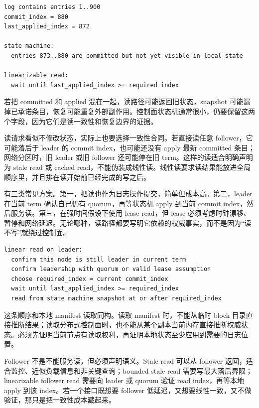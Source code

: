 \begin{lstlisting}[numbers=none,caption={commit 与 apply 的差异}]
log contains entries 1..900
commit_index = 880
last_applied_index = 872

state machine:
  entries 873..880 are committed but not yet visible in local state

linearizable read:
  wait until last_applied_index >= required index
\end{lstlisting}

若把 committed 和 applied 混在一起，读路径可能返回旧状态，snapshot 可能漏掉已承诺条目，恢复可能重复外部副作用。控制面状态机通常很小，仍要保留这两个字段，因为它们是读一致性和恢复边界的证据。

读请求看似不修改状态，实际上也要选择一致性合同。若直接读任意 follower，它可能落后于 leader 的 commit index，也可能还没有 apply 最新 committed 条目；网络分区时，旧 leader 或旧 follower 还可能停在旧 term。这样的读适合明确声明为 stale read 或 cached read，不能伪装成线性读。线性读要求读结果能放进全局顺序里，并且排在读开始前已经完成的写之后。

有三类常见方案。第一，把读也作为日志操作提交，简单但成本高。第二，leader 在当前 term 确认自己仍有 quorum，再等状态机 apply 到当前 commit index，然后服务读。第三，在强时间假设下使用 lease read，但 lease 必须考虑时钟漂移、暂停和网络延迟。无论哪种，读路径都要写明它依赖的权威事实，而不是因为“读不写”就绕过控制面。

\begin{lstlisting}[numbers=none,caption={线性读的最小检查顺序}]
linear read on leader:
  confirm this node is still leader in current term
  confirm leadership with quorum or valid lease assumption
  choose required_index = current commit_index
  wait until last_applied_index >= required_index
  read from state machine snapshot at or after required_index
\end{lstlisting}

这条顺序和本地 manifest 读取同构。读取 manifest 时，不能从临时 block 目录直接推断结果；读取分布式控制面时，也不能从某个副本当前内存直接推断权威状态。必须先证明当前节点有读取权利，再证明本地状态至少应用到需要的日志位置。

Follower 不是不能服务读，但必须声明语义。Stale read 可以从 follower 返回，适合监控、近似负载信息和非关键查询；bounded stale read 需要写最大落后界限；linearizable follower read 需要向 leader 或 quorum 验证 read index，再等本地 apply 到该 index。若一个接口既想要 follower 低延迟，又想要线性一致，又不做验证，那只是把一致性成本藏起来。

